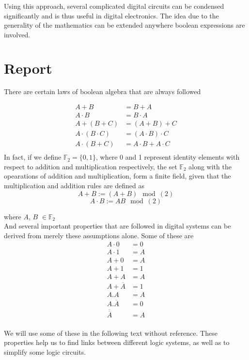 \documentclass{article}
\newcommand{\ol}[1]{\overline{#1}}
\begin{document}
	Using this approach, several complicated digital circuits can be condensed significantly and is thus useful in digital electronics. The idea due to the generality of the mathematics can be extended anywhere boolean expressions are involved.
	\section*{Report}
	There are certain laws of boolean algebra that are always followed

	\begin{align*}
A+B &= B + A \\
A \cdot B &= B\cdot A \tag{Commutative law}\\
A + ( B+ C) & = (A+B)+C\\
A\cdot(B \cdot C) &= (A \cdot B) \cdot C \tag{Associative law}\\
A\cdot(B+C) & = A \cdot B + A\cdot C \tag{Distributive Law}\\
	\end{align*}
	In fact, if we define $\mathbb{F}_2= \{0,1\}$, where 0 and 1 represent identity elements with respect to addition and multiplication respectively, the set $
	\mathbb{F}_2$ along with the opearations of addition and multiplication, form a finite field, given that the multiplication and addition rules are defined as 
	$$ A+B := (A+B)\mod(2) $$
	$$ A\cdot B := AB \mod(2)$$	
	
	where $A$, $B$ $\in \mathbb{F}_2$\\
	
	And several important properties that are followed in digital systems can be derived from merely these assumptions alone. Some of these are 
	\begin{align*}
	 A \cdot 0&=0\\
	 A \cdot 1&=A\\
	 A+0&=A\\
	 A+1 &= 1\\
	 A+A &= A\\
	 A+\ol{A} & = 1\\
	 A.A &= A\\
	 A.\ol{A} & = 0\\
	 \ol{\ol{A}} & = A\\
	\end{align*}
	
	We will use some of these in the following text without reference. These properties help us to find links between different logic systems, as well as to simplify some logic circuits. \\
	
\end{document}
